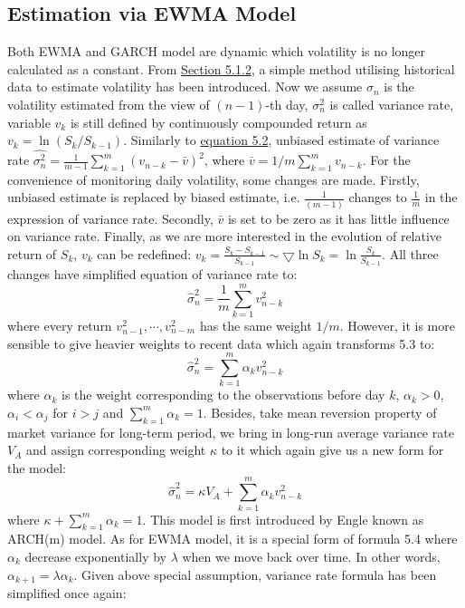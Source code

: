 \subsection{Estimation via EWMA Model}
Both EWMA and GARCH model are dynamic which volatility is no longer calculated as a constant. From  \hyperref[Section 5.1.2]{Section 5.1.2}, a simple method utilising historical data to estimate volatility has been introduced. Now we assume $\sigma_n$ is the volatility estimated from the view of $(n-1)$-th day, $\sigma_n^2$ is called variance rate, variable $v_k$ is still defined by continuously compounded return as $v_k=\ln{(S_k/S_{k-1})}$. Similarly to \hyperref[equation 5.2]{equation 5.2}, unbiased estimate of variance rate $\hat{\sigma_n^2}=\frac{1}{m-1}\sum_{k=1}^{m}(v_{n-k}-\bar{v})^2$, where $\bar{v}=1/m\sum_{k=1}^{m}v_{n-k}$. For the convenience of monitoring daily volatility, some changes are made. Firstly, unbiased estimate is replaced by biased estimate, i.e. $\frac{1}{(m-1)}$ changes to $\frac{1}{m}$ in the expression of variance rate. Secondly, $\bar{v}$ is set to be zero as it has little influence on variance rate. Finally, as we are more interested in the evolution of relative return of $S_k$, $v_k$ can be redefined: $v_k=\frac{S_k-S_{k-1}}{S_{k-1}}\sim\bigtriangledown\ln{S_k}=\ln{\frac{S_k}{S_{k-1}}}$. All three changes have simplified equation of variance rate to:
\begin{equation}
\hat{\sigma}_n^2=\frac{1}{m}\sum_{k=1}^{m}v_{n-k}^2
\end{equation}
where every return $v_{n-1}^2,\cdots,v_{n-m}^2$ has the same weight $1/m$. However, it is more sensible to give heavier weights to recent data which again transforms 5.3 to: 
\begin{equation}\label{5.9}
\hat{\sigma}_n^2=\sum_{k=1}^{m}\alpha_kv_{n-k}^2
\end{equation}
where $\alpha_k$ is the weight corresponding to the observations before day $k$, $\alpha_k>0$, $\alpha_i<\alpha_j$ for $i>j$ and $\sum_{k=1}^{m}\alpha_k=1$. Besides, take mean reversion property of market variance for long-term period, we bring in long-run average variance rate $V_A$ and assign corresponding weight $\kappa$ to it which again give us a new form for the model:
\begin{equation}\label{5.10}
\hat{\sigma}_n^2=\kappa V_A+\sum_{k=1}^{m}\alpha_kv_{n-k}^2
\end{equation}
where $\kappa+\sum_{k=1}^{m}\alpha_k=1$. This model is first introduced by Engle \cite{15} known as ARCH(m) model.
As for EWMA model, it is a special form of formula 5.4 where $\alpha_{k}$ decrease exponentially by $\lambda$ when we move back over time. In other words,  $\alpha_{k+1}=\lambda\alpha_{k}$. Given above special assumption, variance rate formula has been simplified once again:
